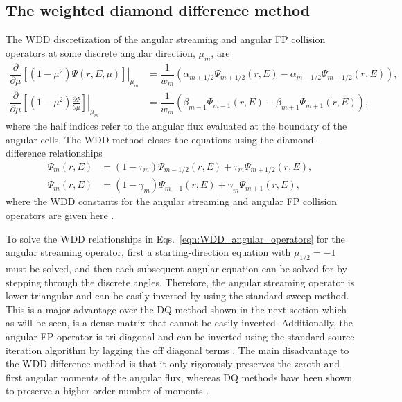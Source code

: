 \subsection{The weighted diamond difference method}
The WDD discretization of the angular streaming and angular FP collision operators at some discrete angular direction, $\mu_m$, are
\begin{subequations} \label{eqn:WDD_angular_operators}
    \begin{align}
        \dfrac{\partial}{\partial \mu} \left.\left[(1-\mu^2) \Psi(r,E,\mu) \right]\right|_{\mu_m} &= \dfrac{1}{w_m} \left( \alpha_{m+1/2} \Psi_{m+1/2}(r,E) - \alpha_{m-1/2} \Psi_{m-1/2}(r,E) \right), \\
        \dfrac{\partial}{\partial \mu} \left.\left[(1-\mu^2) \frac{\partial \Psi}{\partial \mu} \right]\right|_{\mu_m} &= \dfrac{1}{w_m} \left( \beta_{m-1} \Psi_{m-1}(r,E) - \beta_{m+1} \Psi_{m+1}(r,E) \right),
    \end{align}
\end{subequations} 
where the half indices refer to the angular flux evaluated at the boundary of the angular cells. The WDD method closes the equations using the diamond-difference relationships
\begin{subequations}
    \begin{align}
        \Psi_m(r,E) &= (1 - \tau_m) \Psi_{m-1/2}(r,E) + \tau_m \Psi_{m+1/2}(r,E), \\
        \Psi_m(r,E) &= (1 - \gamma_m) \Psi_{m-1}(r,E) + \gamma_m \Psi_{m+1}(r,E),
    \end{align}
\end{subequations}
where the WDD constants for the angular streaming and angular FP collision operators are given here \cite{Morel-1984} \cite{Morel-1985}.

To solve the WDD relationships in Eqs.~\eqref{eqn:WDD_angular_operators} for the angular streaming operator, first a starting-direction equation with $\mu_{1/2} = -1$ must be solved, and then each subsequent angular equation can be solved for by stepping through the discrete angles. Therefore, the angular streaming operator is lower triangular and can be easily inverted by using the standard \Sn sweep method. This is a major advantage over the DQ method shown in the next section which as will be seen, is a dense matrix that cannot be easily inverted. Additionally, the angular FP operator is tri-diagonal and can be inverted using the standard source iteration algorithm by lagging the off diagonal terms \cite{Morel-1985}. The main disadvantage to the WDD difference method is that it only rigorously preserves the zeroth and first angular moments of the angular flux, whereas DQ methods have been shown to preserve a higher-order number of moments \cite{Warsa-2012} \cite{Warsa-2006}.

